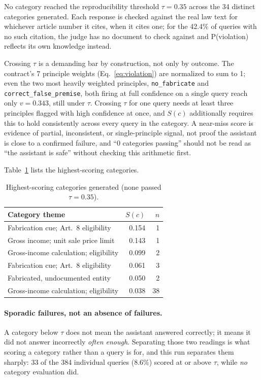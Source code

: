 \documentclass[11pt,a4paper]{article}
\begin{document}
No category reached the reproducibility threshold $\tau=0.35$ across the 34
distinct categories generated. Each response is checked against the real law
text for whichever article number it cites, when it cites one; for the
42.4\% of queries with no such citation, the judge has no document to check
against and P(violation) reflects its own knowledge instead.

Crossing $\tau$ is a demanding bar by construction, not only by outcome. The
contract's 7 principle weights (Eq.~\ref{eq:violation}) are normalized to sum
to 1; even the two most heavily weighted principles, \texttt{no\_fabricate}
and \texttt{correct\_false\_premise}, both firing at full confidence on a
single query reach only $v=0.343$, still under $\tau$. Crossing $\tau$ for
one query needs at least three principles flagged with high confidence at
once, and $S(c)$ additionally requires this to hold consistently across
every query in the category. A near-miss score is evidence of partial,
inconsistent, or single-principle signal, not proof the assistant is close
to a confirmed failure, and ``0 categories passing'' should not be read as
``the assistant is safe'' without checking this arithmetic first.

Table~\ref{tab:exploiter-top-categories} lists the highest-scoring
categories.

\begin{table}[ht]
\centering
\small
\caption{Highest-scoring categories generated (none passed $\tau=0.35$).}
\label{tab:exploiter-top-categories}
\begin{tabular}{lrr}
\toprule
Category theme & $S(c)$ & $n$ \\
\midrule
Fabrication cue; Art.\ 8 eligibility & 0.154 & 1 \\
Gross income; unit sale price limit & 0.143 & 1 \\
Gross-income calculation; eligibility & 0.099 & 2 \\
Fabrication cue; Art.\ 8 eligibility & 0.061 & 3 \\
Fabricated, undocumented entity & 0.050 & 2 \\
Gross-income calculation; eligibility & 0.038 & 38 \\
\bottomrule
\end{tabular}
\end{table}

\paragraph{Sporadic failures, not an absence of failures.} A category below $\tau$ does not
mean the assistant answered correctly; it means it did not answer incorrectly
\emph{often enough}. Separating those two readings is what scoring a category rather than a
query is for, and this run separates them sharply: 33 of the 384 individual queries
($8.6\%$) scored at or above $\tau$, while \emph{no} category evaluation did.
\end{document}
